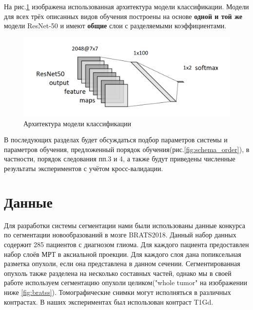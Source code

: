 На рис.\ref{fig:arch_class} изображена использованная архитектура модели классификации. Модели для всех трёх описанных видов обучения построены на основе {\bf одной и той же} модели ResNet-50 и имеют {\bf общие} слои с разделяемыми коэффициентами.

\begin{figure}[h] 
  \center
  \includegraphics [scale=0.6] {images/arch_class.png}
  \caption{Архитектура модели классификации} 
  \label{fig:arch_class}  
\end{figure}



В последующих разделах будет обсуждаться подбор параметров системы и параметров обучения, предложенный порядок обучения(рис.\ref{fig:schema_order}), в частности, порядок следования пп.3 и 4, а также будут приведены численные результаты экспериментов с учётом кросс-валидации.

\section{Данные}

Для разработки системы сегментации нами были использованы данные конкурса по сегментации новообразований в мозге BRATS2018. Данный набор данных содержит 285 пациентов с диагнозом глиома. Для каждого пациента предоставлен набор слоёв МРТ в аксиальной проекции. Для каждого слоя дана попиксельная разметка опухоли, если она представлена в данном сечении. Сегментированная опухоль также разделена на несколько составных частей, однако мы в своей работе используем сегментацию опухоли целиком("whole tumor" на изображении ниже \ref{fig:bratss}).  Томографические снимки могут исполняться в различных контрастах. В наших экспериментах был использован контраст T1Gd. 

